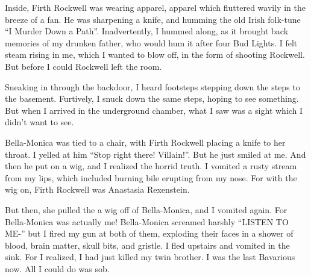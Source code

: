 Inside, Firth Rockwell was wearing apparel, apparel which fluttered
wavily in the breeze of a fan. He was sharpening a knife, and
humming the old Irish folk-tune ``I Murder Down a Path''.
Inadvertently, I hummed along, as it brought back memories of my
drunken father, who would hum it after four Bud Lights. I felt
steam rising in me, which I wanted to blow off, in the form of
shooting Rockwell. But before I could Rockwell left the room.



Sneaking in through the backdoor, I heard footsteps stepping down
the steps to the basement. Furtively, I snuck down the same steps,
hoping to see something. But when I arrived in the underground
chamber, what I saw was a sight which I didn't want to see.



Bella-Monica was tied to a chair, with Firth Rockwell placing a
knife to her throat. I yelled at him ``Stop right there!
Villain!''. But he just smiled at me. And then he put on a
wig, and I realized the horrid truth. I vomited a rusty stream from
my lips, which included burning bile erupting from my nose. For
with the wig on, Firth Rockwell was Anastasia Rexenstein.



But then, she pulled the a wig off of Bella-Monica, and I vomited
again. For Bella-Monica was actually me! Bella-Monica screamed
harshly ``LISTEN TO ME-'' but I fired my gun at both of them,
exploding their faces in a shower of blood, brain matter, skull
bits, and gristle. I fled upstairs and vomited in the sink. For I
realized, I had just killed my twin brother. I was the last
Bavarious now. All I could do was sob. 

 







